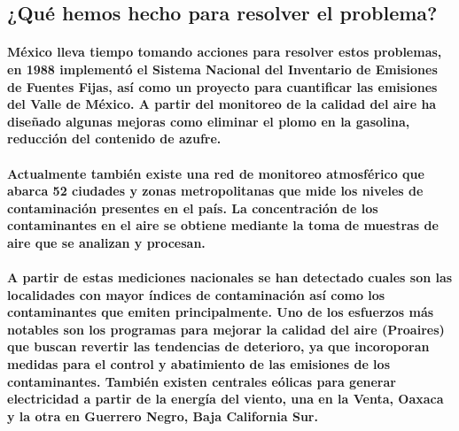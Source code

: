   \subsection {¿Qué hemos hecho para resolver el problema?}
    \paragraph {México lleva tiempo tomando acciones para resolver estos problemas, en 1988 implementó el Sistema Nacional del Inventario de Emisiones de Fuentes Fijas, así como un proyecto para cuantificar las emisiones del Valle de México. A partir del monitoreo de la calidad del aire ha diseñado algunas mejoras como eliminar el plomo en la gasolina, reducción del contenido de azufre.}

    \paragraph {Actualmente también existe una red de monitoreo atmosférico que abarca 52 ciudades y zonas metropolitanas que mide los niveles de contaminación presentes en el país. La concentración de los contaminantes en el aire se obtiene mediante la toma de muestras de aire que se analizan y procesan.}

    \paragraph {A partir de estas mediciones nacionales se han detectado cuales son las localidades con mayor índices de contaminación así como los contaminantes que emiten principalmente.  Uno de los esfuerzos más notables son los programas para mejorar la calidad del aire (Proaires) que buscan revertir las tendencias de deterioro, ya que incoroporan medidas para el control y abatimiento de las emisiones de los contaminantes.  También existen centrales eólicas para generar electricidad a partir de la energía del viento, una en la Venta, Oaxaca y la otra en Guerrero Negro, Baja California Sur.}
